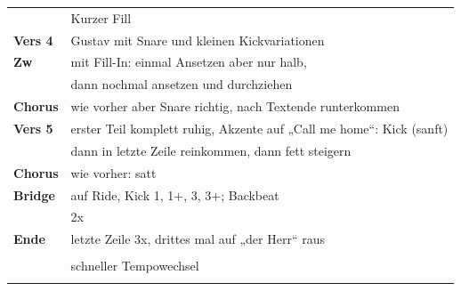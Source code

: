 \begin{tabular}{p{1.6cm}l}
	                & Kurzer Fill                                                          \\
	\textbf{Vers 4} & Gustav mit Snare und kleinen Kickvariationen                         \\
	\textbf{Zw}     & mit Fill-In: einmal Ansetzen aber nur halb,                          \\
	                & dann nochmal ansetzen und durchziehen                                \\
	\textbf{Chorus} & wie vorher aber Snare richtig, nach Textende runterkommen            \\
	\textbf{Vers 5} & erster Teil komplett ruhig, Akzente auf „Call me home“: Kick (sanft) \\
	                & dann in letzte Zeile reinkommen, dann fett steigern                  \\
	\textbf{Chorus} & wie vorher: satt                                                     \\
	\textbf{Bridge} & auf Ride, Kick 1, 1+, 3, 3+; Backbeat           \\
	                & 2x                                              \\
	\textbf{Ende}   & letzte Zeile 3x, drittes mal auf „der Herr“ raus                     \\
	                &                                                  \\
	                & schneller Tempowechsel                           \\
	                &                                                  \\
\end{tabular}

